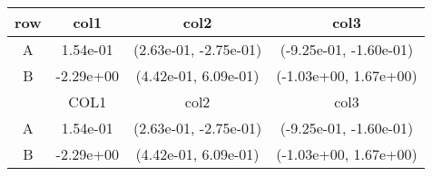 \begin{tabular}{cccc}
\toprule
row&col1&col2&col3\tabularnewline
\midrule
A&1.54e-01& (2.63e-01, -2.75e-01)& (-9.25e-01, -1.60e-01)\tabularnewline
B&-2.29e+00& (4.42e-01, 6.09e-01)& (-1.03e+00, 1.67e+00)\tabularnewline
\midrule
&COL1&col2&col3\tabularnewline
\midrule
A&1.54e-01& (2.63e-01, -2.75e-01)& (-9.25e-01, -1.60e-01)\tabularnewline
B&-2.29e+00& (4.42e-01, 6.09e-01)& (-1.03e+00, 1.67e+00)\tabularnewline
\bottomrule
\end{tabular}
